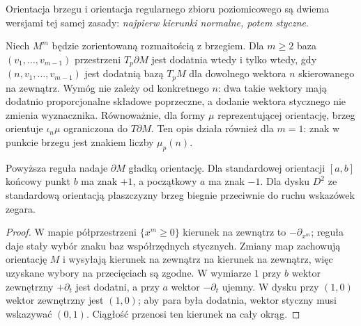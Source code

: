 Orientacja brzegu i orientacja regularnego zbioru
poziomicowego są dwiema wersjami tej samej zasady:
\emph{najpierw kierunki normalne, potem styczne}.

\begin{definicja}
\label{def:orientacja-brzegu}
Niech $M^m$ będzie zorientowaną rozmaitością z brzegiem.
Dla $m\geq2$ baza $(v_1,\ldots,v_{m-1})$ przestrzeni $T_p\partial M$
jest dodatnia wtedy i tylko wtedy, gdy
$(n,v_1,\ldots,v_{m-1})$ jest dodatnią bazą $T_pM$
dla dowolnego wektora $n$ skierowanego na zewnątrz.
Wymóg nie zależy od konkretnego $n$: dwa takie wektory
mają dodatnio proporcjonalne składowe poprzeczne,
a dodanie wektora stycznego nie zmienia wyznacznika.
Równoważnie, dla formy $\mu$ reprezentującej orientację,
brzeg orientuje $\iota_n\mu$ ograniczona do $T\partial M$.
Ten opis działa również dla $m=1$: znak w punkcie brzegu
jest znakiem liczby $\mu_p(n)$.
\end{definicja}

\begin{stwierdzenie}
\label{prop:brzeg-orientowalny}
Powyższa reguła nadaje $\partial M$ gładką orientację.
Dla standardowej orientacji $[a,b]$ końcowy punkt $b$
ma znak $+1$, a początkowy $a$ ma znak $-1$.
Dla dysku $D^2$ ze standardową orientacją płaszczyzny
brzeg biegnie przeciwnie do ruchu wskazówek zegara.
\end{stwierdzenie}
\begin{proof}
W mapie półprzestrzeni $\{x^m\geq0\}$ kierunek
na zewnątrz to $-\partial_{x^m}$; reguła daje
stały wybór znaku baz współrzędnych stycznych.
Zmiany map zachowują orientację $M$ i wysyłają
kierunek na zewnątrz na kierunek na zewnątrz,
więc uzyskane wybory na przecięciach są zgodne.
W wymiarze $1$ przy $b$ wektor zewnętrzny
$+\partial_t$ jest dodatni, a przy $a$ wektor
$-\partial_t$ ujemny. W dysku przy $(1,0)$
wektor zewnętrzny jest $(1,0)$; aby para była
dodatnia, wektor styczny musi wskazywać $(0,1)$.
Ciągłość przenosi ten kierunek na cały okrąg.
\end{proof}

